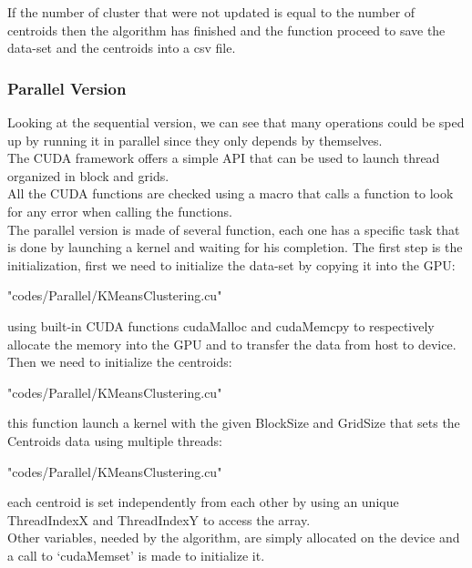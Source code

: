 \documentclass[10pt,twocolumn,letterpaper]{article}
\begin{document}
If the number of cluster that were not updated is equal to the number of centroids then the algorithm has finished and the function
proceed to save the data-set and the centroids into a csv file.

\subsubsection{Parallel Version}
Looking at the sequential version, we can see that many operations could be sped up by running it in parallel since they only depends by
themselves.\\
The CUDA framework offers a simple API that can be used to launch thread organized in block and grids.\\
All the CUDA functions are checked using a macro that calls a function to look for any error when calling the functions.\\
The parallel version is made of several function, each one has a specific task that is done by launching a kernel and waiting for his
completion.\newpage
The first step is the initialization, first we need to initialize the data-set by copying it into the GPU:\\
\begin{lstinputlisting}[language=C,style=CSnippetStyle,caption=CUDA Data-Set Initialization,firstline=244,lastline=254]{
	"codes/Parallel/KMeansClustering.cu"}
\end{lstinputlisting}
using built-in CUDA functions cudaMalloc and cudaMemcpy to respectively allocate the memory into the GPU and to transfer the data from
host to device.\\
Then we need to initialize the centroids:\\
\begin{lstinputlisting}[language=C,style=CSnippetStyle,caption=CUDA Centroids Initialization,firstline=186,lastline=203]{
	"codes/Parallel/KMeansClustering.cu"}
\end{lstinputlisting}
this function launch a kernel with the given BlockSize and GridSize that sets the Centroids data using multiple threads:\newpage
\begin{lstinputlisting}[language=C,style=CSnippetStyle,caption=CUDA Centroids Initialization,firstline=105,lastline=114]{
	"codes/Parallel/KMeansClustering.cu"}
\end{lstinputlisting}
each centroid is set independently from each other by using an unique ThreadIndexX and ThreadIndexY to access the array.\\
Other variables, needed by the algorithm, are simply allocated on the device and a call to `cudaMemset' is made to initialize it.\\
\end{document}
